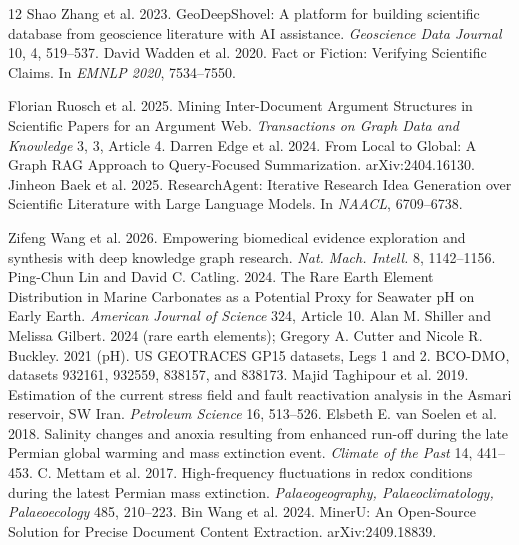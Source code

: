 \documentclass[sigconf,screen,review]{acmart}
\begin{document}
\begin{thebibliography}{12}
Shao Zhang et al. 2023. GeoDeepShovel: A platform for building scientific database from geoscience literature with AI assistance. \emph{Geoscience Data Journal} 10, 4, 519--537.
David Wadden et al. 2020. Fact or Fiction: Verifying Scientific Claims. In \emph{EMNLP 2020}, 7534--7550.


Florian Ruosch et al. 2025. Mining Inter-Document Argument Structures in Scientific Papers for an Argument Web. \emph{Transactions on Graph Data and Knowledge} 3, 3, Article 4.
Darren Edge et al. 2024. From Local to Global: A Graph RAG Approach to Query-Focused Summarization. arXiv:2404.16130.
Jinheon Baek et al. 2025. ResearchAgent: Iterative Research Idea Generation over Scientific Literature with Large Language Models. In \emph{NAACL}, 6709--6738.



Zifeng Wang et al. 2026. Empowering biomedical evidence exploration and synthesis with deep knowledge graph research. \emph{Nat. Mach. Intell.} 8, 1142--1156.
Ping-Chun Lin and David C. Catling. 2024. The Rare Earth Element Distribution in Marine Carbonates as a Potential Proxy for Seawater pH on Early Earth. \emph{American Journal of Science} 324, Article 10.
Alan M. Shiller and Melissa Gilbert. 2024 (rare earth elements); Gregory A. Cutter and Nicole R. Buckley. 2021 (pH). US GEOTRACES GP15 datasets, Legs 1 and 2. BCO-DMO, datasets 932161, 932559, 838157, and 838173.
Majid Taghipour et al. 2019. Estimation of the current stress field and fault reactivation analysis in the Asmari reservoir, SW Iran. \emph{Petroleum Science} 16, 513--526.
Elsbeth E. van Soelen et al. 2018. Salinity changes and anoxia resulting from enhanced run-off during the late Permian global warming and mass extinction event. \emph{Climate of the Past} 14, 441--453.
C. Mettam et al. 2017. High-frequency fluctuations in redox conditions during the latest Permian mass extinction. \emph{Palaeogeography, Palaeoclimatology, Palaeoecology} 485, 210--223.
Bin Wang et al. 2024. MinerU: An Open-Source Solution for Precise Document Content Extraction. arXiv:2409.18839.
\end{thebibliography}
\end{document}
